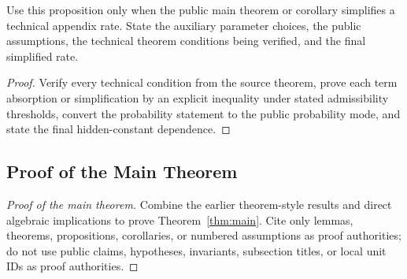\begin{proposition}\label{prop:rate-specialization-bridge}
Use this proposition only when the public main theorem or corollary simplifies a
technical appendix rate. State the auxiliary parameter choices, the public
assumptions, the technical theorem conditions being verified, and the final
simplified rate.
\end{proposition}

\begin{proof}
Verify every technical condition from the source theorem, prove each term
absorption or simplification by an explicit inequality under stated
admissibility thresholds, convert the probability statement to the public
probability mode, and state the final hidden-constant dependence.
\end{proof}

\subsection{Proof of the Main Theorem}

\begin{proof}[Proof of the main theorem]
Combine the earlier theorem-style results and direct algebraic implications to
prove Theorem~\ref{thm:main}. Cite only lemmas, theorems, propositions,
corollaries, or numbered assumptions as proof authorities; do not use public
claims, hypotheses, invariants, subsection titles, or local unit IDs as proof
authorities.
\end{proof}

